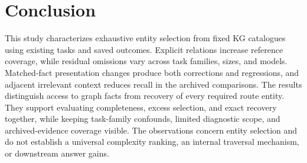 \section{Conclusion}
\label{sec:conclusion}
This study characterizes exhaustive entity selection from fixed KG catalogues using existing tasks and saved outcomes. Explicit relations increase reference coverage, while residual omissions vary across task families, sizes, and models. Matched-fact presentation changes produce both corrections and regressions, and adjacent irrelevant context reduces recall in the archived comparisons. The results distinguish access to graph facts from recovery of every required route entity. They support evaluating completeness, excess selection, and exact recovery together, while keeping task-family confounds, limited diagnostic scope, and archived-evidence coverage visible. The observations concern entity selection and do not establish a universal complexity ranking, an internal traversal mechanism, or downstream answer gains.
